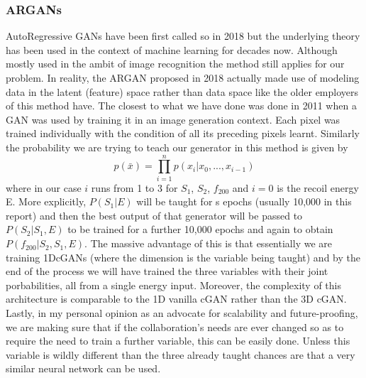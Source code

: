 \documentclass[11pt]{article} %
\begin{document}
\subsubsection{ARGANs}
AutoRegressive GANs have been first called so in 2018 but the underlying theory has been used in the context of machine learning for decades now.
Although mostly used in the ambit of image recognition the method still applies for our problem.
In reality, the ARGAN proposed in 2018 actually made use of modeling data in the latent (feature) space rather than data space like the older
employers of this method have.
The closest to what we have done was done in 2011 when a GAN was used by training it in an image generation context.
Each pixel was trained individually with the condition of all its preceding pixels learnt.
Similarly the probability we are trying to teach our generator in this method is given by
\begin{equation}
  p(\bar x)= \prod_{i=1}^np(x_i|x_0,...,x_{i-1})
  \label{eq:prob_dist}
\end{equation}
where in our case $i$ runs from 1 to 3 for $S_1$, $S_2$, $f_200$ and $i=0$ is the recoil energy E.
More explicitly, $P(S_1|E)$ will be taught for s epochs (usually 10,000 in this report) and then the best output of that generator will be
passed to $P(S_2|S_1,E)$ to be trained for a further 10,000 epochs and again to obtain $P(f_{200}|S_2,S_1,E)$.
The massive advantage of this is that essentially we are training 1DcGANs (where the dimension is the variable being taught) and
by the end of the process we will have trained the three variables with their joint porbabilities, all from a single energy input.
Moreover, the complexity of this architecture is comparable to the 1D vanilla cGAN rather than the 3D cGAN.
Lastly, in my personal opinion as an advocate for scalability and future-proofing, we are making sure that if the collaboration's needs
are ever changed so as to require the need to train a further variable, this can be easily done.
Unless this variable is wildly different than the three already taught chances are that a very similar neural network can be used.
\end{document}
